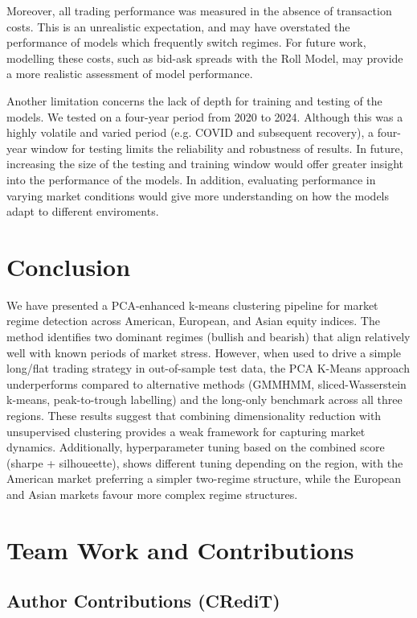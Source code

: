 \documentclass[11pt, a4paper]{article}
\begin{document}
Moreover, all trading performance was measured in the absence of transaction costs. This is an unrealistic expectation, and may have overstated the performance of models which frequently switch regimes. For future work, modelling these costs, such as bid-ask spreads with the Roll Model, may provide a more realistic assessment of model performance.

Another limitation concerns the lack of depth for training and testing of the models. We tested on a four-year period from 2020 to 2024. Although this was a highly volatile and varied period (e.g. COVID and subsequent recovery), a four-year window for testing limits the reliability and robustness of results. In future, increasing the size of the testing and training window would offer greater insight into the performance of the models. In addition, evaluating performance in varying market conditions would give more understanding on how the models adapt to different enviroments.

\section{Conclusion}
We have presented a PCA-enhanced k-means clustering pipeline for market regime detection across American, European, and Asian equity indices. The method identifies two dominant regimes (bullish and bearish) that align relatively well with known periods of market stress. However, when used to drive a simple long/flat trading strategy in out-of-sample test data, the PCA K-Means approach underperforms  compared to alternative methods (GMMHMM, sliced-Wasserstein k-means, peak-to-trough labelling) and the long-only benchmark across all three regions.
These results suggest that combining dimensionality reduction with unsupervised clustering provides a weak framework for capturing market dynamics. 
Additionally, hyperparameter tuning based on the combined score (sharpe + silhoueette), shows different tuning depending on the region, with the American market preferring a simpler two-regime structure, while the European and Asian markets favour more complex regime structures.






\section{Team Work and Contributions}
\subsection{Author Contributions (CRediT)}
\end{document}
